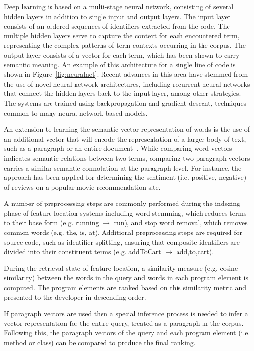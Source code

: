 Deep learning is based on a multi-stage neural network, consisting of
several hidden layers in addition to single input and output layers.
The input layer consists of an ordered sequences of identifiers
extracted from the code. The multiple hidden layers serve to capture
the context for each encountered term, representing the complex
patterns of term contexts occurring in the corpus. The output layer
consists of a vector for each term, which has been shown to carry
semantic meaning. An example of this architecture for a single line of
code is shown in Figure~\ref{fig:neuralnet}. Recent advances in this
area have stemmed from the use of novel neural network architectures,
including recurrent neural networks that connect the hidden layers
back to the input layer, among other strategies. The systems are
trained using backpropagation and gradient descent, techniques common
to many neural network based models.

An extension to learning the semantic vector representation of words
is the use of an additional vector that will encode the representation
of a larger body of text, such as a paragraph or an entire
document~\cite{le_distributed_2014}. While comparing word vectors
indicates semantic relations between two terms, comparing two
paragraph vectors carries a similar semantic connotation at the
paragraph level. For instance, the approach has been applied for
determining the sentiment (i.e. positive, negative) of reviews on a
popular movie recommendation site.

A number of preprocessing steps are commonly performed during the
indexing phase of feature location systems including word stemming,
which reduces terms to their base form (e.g. running $\rightarrow$
run), and stop word removal, which removes common words (e.g. the, is,
at). Additional preprocessing steps are required for source code, such
as identifier splitting, ensuring that composite identifiers are
divided into their constituent terms (e.g. addToCart $\rightarrow$
add,to,cart). 


During the retrieval state of feature location, a similarity measure
(e.g. cosine similarity) between the words in the query and words in
each program element is computed. The program elements are ranked
based on this similarity metric and presented to the developer in
descending order. 

If paragraph vectors are used then a special inference process is
needed to infer a vector representation for the entire query, treated
as a paragraph in the corpus. Following this, the paragraph vectors of
the query and each program element (i.e. method or class) can be
compared to produce the final ranking.

